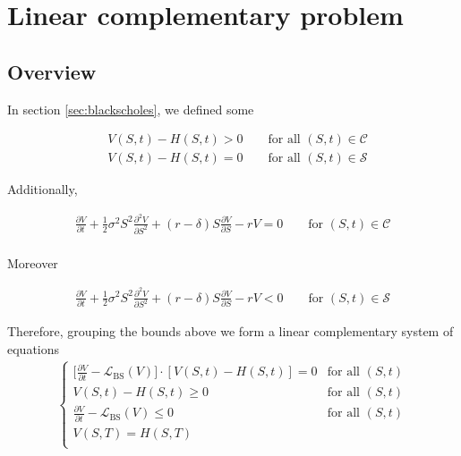 \section{Linear complementary problem}

\subsection{Overview}

In section \ref{sec:blackscholes}, we defined some


\begin{align*}
  &V(S, t) - H(S, t) > 0 \qquad \text{for all $(S,t) \in \mathcal{C}$} \\ 
  &V(S, t) - H(S, t) = 0 \qquad \text{for all $(S,t) \in \mathcal{S}$}
\end{align*}

Additionally,

\begin{align*}
    \frac{\partial{V}}{\partial{t}} + \frac{1}{2}\sigma^{2} S^2 \frac{\partial^2{V}}{\partial{S^2}} + (r - \delta)S \frac{\partial{V}}{\partial{S}} - rV = 0 \qquad \text{for $(S,t) \in \mathcal{C}$} \\
\end{align*}
  
Moreover

\begin{align*}
    \frac{\partial{V}}{\partial{t}} + \frac{1}{2}\sigma^{2} S^2 \frac{\partial^2{V}}{\partial{S^2}} + (r - \delta)S \frac{\partial{V}}{\partial{S}} - rV < 0 \qquad \text{for $(S,t) \in \mathcal{S}$}
\end{align*}

Therefore, grouping the bounds above we form a linear complementary system of equations
{
  \color{red}  
  \begin{align}
    \begin{cases}
      \big[\frac{\partial V}{\partial t} - \mathcal{L}_{\text{BS}}(V)\big] \cdot [V(S,t) - H(S,t)] = 0 & \text{for all $(S,t)$} \\
      V(S, t) - H(S, t) \ge 0 & \text{for all $(S, t)$}\\
      \frac{\partial V}{\partial t} - \mathcal{L}_{\text{BS}}(V) \le 0 &  \text{for all $(S, t)$}\\
      V(S, T) = H(S, T) \\  
    \end{cases}
    \label{eq:background:finance:linear_complementary_problem}
  \end{align}
}

